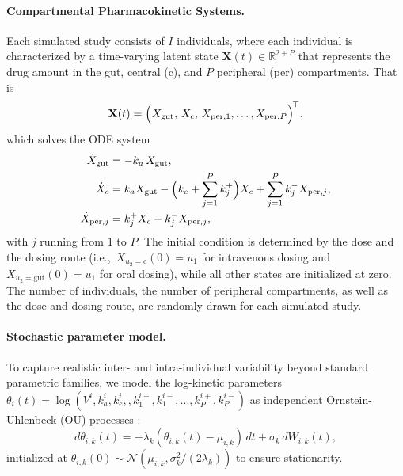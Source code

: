\paragraph{Compartmental Pharmacokinetic Systems.}
Each simulated study consists of $I$ individuals, where each individual is characterized by a time-varying latent state $\mathbf{X}(t) \in \mathbb{R}^{2+P}$ that represents the drug amount in the gut, central (c), and $P$ peripheral (per) compartments. That is
\begin{equation}
    \mathbf{X}(t)= \Bigl(X_{\text{gut}},\,X_{c},\,X_{\text{per},1}, \dots, X_{\text{per},P} \Bigr)^{\!\top}.
\end{equation}
%
%
which solves the ODE system
\begin{align}
\dot X_{\text{gut}}      &= -k_{a}\,X_{\text{gut}}, \nonumber\\
\dot X_{c}               &= k_{a}X_{\text{gut}}
                           -\Bigl(k_{e}+\sum_{j=1}^{P}k^{+}_{j}\Bigr)X_{c}
                           +\sum_{j=1}^{P}k^{-}_{j}X_{\text{per},j}, \nonumber\\
\dot X_{\text{per},j}    &= k^{+}_{j}X_{c}-k^{-}_{j}X_{\text{per},j},                
\label{eq:pk-odes}                           
\end{align}
with $j$ running from $1$ to $P$.
%
The initial condition is determined by the dose and the dosing route (i.e.,~$X_{u_2=c}(0)=u_1$ for intravenous dosing and $X_{u_2=\text{gut}}(0) = u_1$ for oral dosing), while all other states are initialized at zero.
%
The number of individuals, the number of peripheral compartments, as well as the dose and dosing route, are randomly drawn for each simulated study.

\paragraph{Stochastic parameter model.}
To capture realistic inter- and intra-individual variability beyond standard parametric families, we model the log-kinetic parameters $\theta_i(t)=\log ( V^i, k^i_a,  k^i_e, , k^{i+}_1,  k^{i-}_1,..., k^{i+}_P, k^{i-}_P)$ as independent Ornstein-Uhlenbeck (OU) processes :
%
\begin{equation}
d\theta_{i,k}(t)=
  -\lambda_{k}\!\left(\theta_{i,k}(t)-\mu_{i,k}\right)\,dt
  +\sigma_{k}\,dW_{i,k}(t),
\label{eq:ou}
\end{equation}
%
initialized at $\theta_{i,k}(0)\sim \mathcal{N}(\mu_{i,k},\sigma_k^2/(2\lambda_k))$ to ensure stationarity.


